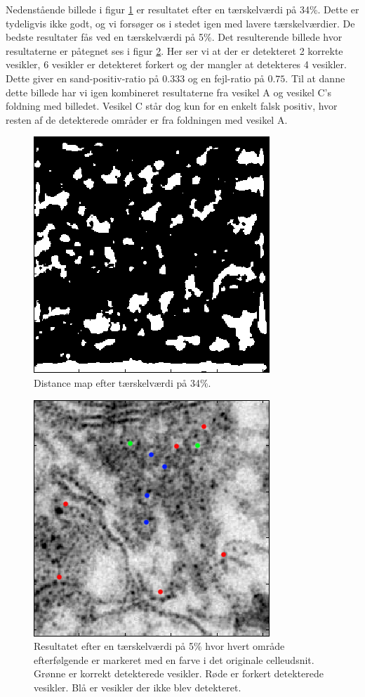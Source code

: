 Nedenstående billede i figur \ref{fig:postmethod_conv_post_img2_th34} er resultatet efter en tærskelværdi på 34\%. Dette er tydeligvis ikke godt, og vi forsøger os i stedet igen med lavere tærskelværdier. De bedste resultater fås ved en tærskelværdi på 5\%. Det resulterende billede hvor resultaterne er påtegnet ses i figur \ref{fig:postmethod_conv_post_img2_th5}. Her ser vi at der er detekteret 2 korrekte vesikler, 6 vesikler er detekteret forkert og der mangler at detekteres 4 vesikler. Dette giver en sand-positiv-ratio på $0.333$ og en fejl-ratio på $0.75$. Til at danne dette billede har vi igen kombineret resultaterne fra vesikel A og vesikel C's foldning med billedet. Vesikel C står dog kun for en enkelt falsk positiv, hvor resten af de detekterede områder er fra foldningen med vesikel A.

\begin{figure}[H]
		\centering		\includegraphics[scale=0.65]{files/postmethod/img/ves1+2_img2_th-34.png}
	\caption{Distance map efter tærskelværdi på 34\%.\label{fig:postmethod_conv_post_img2_th34}}
\end{figure}

\begin{figure}[H]
		\centering
	\includegraphics[scale=0.65]{files/postmethod/img/ves1+2_img2_th-5.png}
	\caption{Resultatet efter en tærskelværdi på 5\% hvor hvert område efterfølgende er markeret med en farve i det originale celleudsnit. Grønne er korrekt detekterede vesikler. Røde er forkert detekterede vesikler. Blå er vesikler der ikke blev detekteret.\label{fig:postmethod_conv_post_img2_th5}}
\end{figure}


